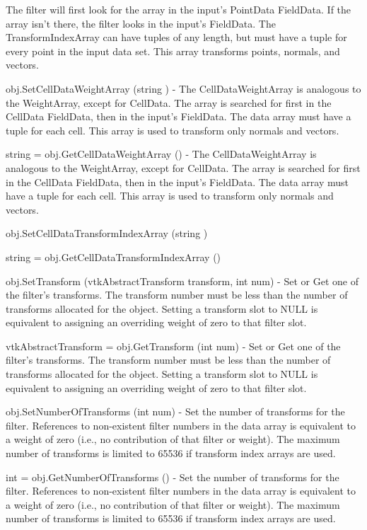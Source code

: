 \begin{DoxyItemize}
The filter will first look for the array in the input's Point\-Data Field\-Data. If the array isn't there, the filter looks in the input's Field\-Data. The Transform\-Index\-Array can have tuples of any length, but must have a tuple for every point in the input data set. This array transforms points, normals, and vectors.  
\item {\ttfamily obj.\-Set\-Cell\-Data\-Weight\-Array (string )} -\/ The Cell\-Data\-Weight\-Array is analogous to the Weight\-Array, except for Cell\-Data. The array is searched for first in the Cell\-Data Field\-Data, then in the input's Field\-Data. The data array must have a tuple for each cell. This array is used to transform only normals and vectors.  
\item {\ttfamily string = obj.\-Get\-Cell\-Data\-Weight\-Array ()} -\/ The Cell\-Data\-Weight\-Array is analogous to the Weight\-Array, except for Cell\-Data. The array is searched for first in the Cell\-Data Field\-Data, then in the input's Field\-Data. The data array must have a tuple for each cell. This array is used to transform only normals and vectors.  
\item {\ttfamily obj.\-Set\-Cell\-Data\-Transform\-Index\-Array (string )}  
\item {\ttfamily string = obj.\-Get\-Cell\-Data\-Transform\-Index\-Array ()}  
\item {\ttfamily obj.\-Set\-Transform (vtk\-Abstract\-Transform transform, int num)} -\/ Set or Get one of the filter's transforms. The transform number must be less than the number of transforms allocated for the object. Setting a transform slot to N\-U\-L\-L is equivalent to assigning an overriding weight of zero to that filter slot.  
\item {\ttfamily vtk\-Abstract\-Transform = obj.\-Get\-Transform (int num)} -\/ Set or Get one of the filter's transforms. The transform number must be less than the number of transforms allocated for the object. Setting a transform slot to N\-U\-L\-L is equivalent to assigning an overriding weight of zero to that filter slot.  
\item {\ttfamily obj.\-Set\-Number\-Of\-Transforms (int num)} -\/ Set the number of transforms for the filter. References to non-\/existent filter numbers in the data array is equivalent to a weight of zero (i.\-e., no contribution of that filter or weight). The maximum number of transforms is limited to 65536 if transform index arrays are used.  
\item {\ttfamily int = obj.\-Get\-Number\-Of\-Transforms ()} -\/ Set the number of transforms for the filter. References to non-\/existent filter numbers in the data array is equivalent to a weight of zero (i.\-e., no contribution of that filter or weight). The maximum number of transforms is limited to 65536 if transform index arrays are used.  

\end{DoxyItemize}
